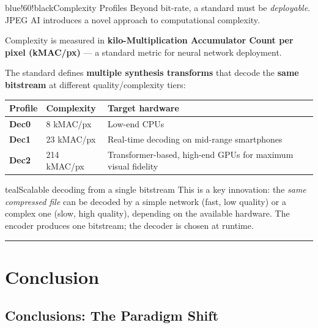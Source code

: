 \begin{calloutbox}{blue!60!black}{Complexity Profiles}
Beyond bit-rate, a standard must be \textit{deployable}. JPEG AI introduces a novel approach to computational complexity.

Complexity is measured in \textbf{kilo-Multiplication Accumulator Count per pixel (kMAC/px)} — a standard metric for neural network deployment.

The standard defines \textbf{multiple synthesis transforms} that decode the \textbf{same bitstream} at different quality/complexity tiers:
\end{calloutbox}

\begin{center}
\begin{tabular}{|l|l|l|}
\hline
\textbf{Profile} & \textbf{Complexity} & \textbf{Target hardware} \\ \hline
\textbf{Dec0} & 8 kMAC/px & Low-end CPUs \\ \hline
\textbf{Dec1} & 23 kMAC/px & Real-time decoding on mid-range smartphones \\ \hline
\textbf{Dec2} & 214 kMAC/px & Transformer-based, high-end GPUs for maximum visual fidelity \\ \hline
\end{tabular}
\end{center}

\begin{calloutbox}{teal}{Scalable decoding from a single bitstream}
This is a key innovation: the \textit{same compressed file} can be decoded by a simple network (fast, low quality) or a complex one (slow, high quality), depending on the available hardware. The encoder produces one bitstream; the decoder is chosen at runtime.
\end{calloutbox}

\bigskip\hrule\bigskip

\section{Conclusion}

\subsection{Conclusions: The Paradigm Shift}

